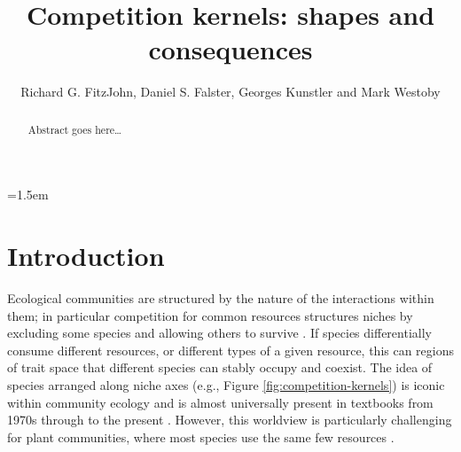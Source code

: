 \documentclass[a4paper,11pt]{article}
\title{Competition kernels: shapes and consequences}
\author{Richard G. FitzJohn, Daniel S. Falster, Georges Kunstler and Mark Westoby}
\date{}
\affiliation{Department of Biological Sciences, Macquarie University,
  Sydney, Australia}
\begin{document}

\mstitlepage
\parindent=1.5em
\addtolength{\parskip}{.3em}

\begin{abstract}
Abstract goes here\ldots
\end{abstract}

\section{Introduction}

%
Ecological communities are structured by the nature of the
interactions within them;
in particular competition for common resources structures niches by
excluding some species and allowing others to survive
\citep[e.g.][]{Gause-1934,Lack-1947,MacArthur-1967}.
%
If species differentially consume different resources, or different
types of a given resource, this can regions of trait space that
different species can stably occupy and coexist.
%
The idea of species arranged along niche axes (e.g., Figure
\ref{fig:competition-kernels}) is iconic within community ecology and
is almost universally present in textbooks from 1970s through to the
present \citep[e.g.,][]{Krebs-1972, Ricklefs-1973, Ricklefs-1999,
  Krebs-2013}.
%
However, this worldview is particularly challenging for plant
communities, where most species use the same few resources
\citep[e.g.,][]{Whittaker-1970, Grime-1979, Hubbell-2001,
  Westoby-2002}.
\end{document}
